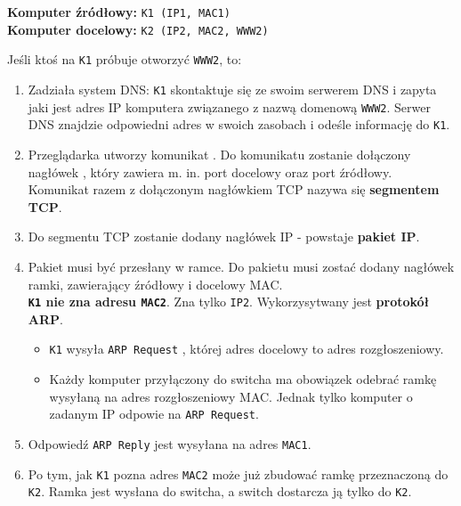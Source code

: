 \documentclass[../sk-egzamin.tex]{subfiles}
\begin{document}

\textbf{Komputer źródłowy:} \texttt{K1 (IP1, MAC1)}\\
\textbf{Komputer docelowy:} \texttt{K2 (IP2, MAC2, WWW2)}

Jeśli ktoś na \texttt{K1} próbuje otworzyć \texttt{WWW2}, to:
\begin{enumerate}
    \item Zadziała system DNS: \texttt{K1} skontaktuje się ze swoim
    serwerem DNS i zapyta jaki jest adres IP komputera
    związanego z nazwą domenową \texttt{WWW2}.
    Serwer DNS znajdzie odpowiedni adres w swoich zasobach i odeśle informację
    do \texttt{K1}.

    \item Przeglądarka utworzy komunikat .
    Do komunikatu zostanie dołączony nagłówek ,
    który zawiera m. in. port docelowy  oraz port
    źródłowy.
    Komunikat razem z dołączonym nagłówkiem TCP nazywa się \textbf{segmentem
    TCP}.

    \item Do segmentu TCP zostanie dodany nagłówek IP - powstaje
    \textbf{pakiet IP}.

    \item Pakiet musi być przesłany w ramce.
    Do pakietu musi zostać dodany nagłówek ramki, zawierający źródłowy i
    docelowy MAC.\\
    \textbf{\texttt{K1} nie zna adresu \texttt{MAC2}}.
    Zna tylko \texttt{IP2}.
    Wykorzysytwany jest \textbf{protokół ARP}.
    \begin{itemize}
        \item \texttt{K1} wysyła \texttt{ARP Request}
        , której adres docelowy to adres
        rozgłoszeniowy.

        \item Każdy komputer przyłączony do switcha ma obowiązek odebrać
        ramkę wysyłaną na adres rozgłoszeniowy MAC.
        Jednak tylko komputer o zadanym IP odpowie na \texttt{ARP Request}.
    \end{itemize}

    \item Odpowiedź \texttt{ARP Reply} jest wysyłana na adres \texttt{MAC1}.

    \item Po tym, jak \texttt{K1} pozna adres \texttt{MAC2} może już zbudować
    ramkę przeznaczoną do \texttt{K2}.
    Ramka jest wysłana do switcha, a switch dostarcza ją tylko do \texttt{K2}.


\end{enumerate}
\end{document}
